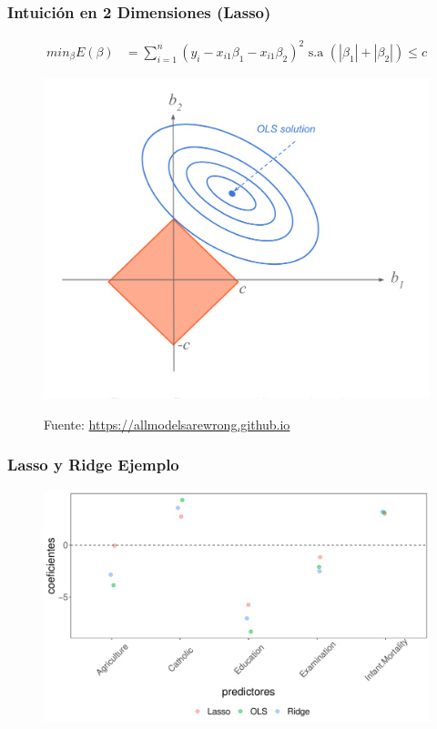 \documentclass[
  shownotes,
  xcolor={svgnames},
  hyperref={colorlinks,citecolor=DarkBlue,linkcolor=DarkRed,urlcolor=DarkBlue}
  , aspectratio=169]{beamer}
\begin{document}
\begin{frame}[fragile]
\frametitle{Intuición en 2 Dimensiones (Lasso)}

\begin{align}
     min_{\beta} E(\beta) &= \sum_{i=1}^n (y_i - x_{i1}\beta_1 - x_{i1}\beta_2)^2  \text{ s.a }   \left( |\beta_1| + |\beta_2| \right) \leq c 
  \end{align}

\begin{figure}[H] \centering
            \captionsetup{justification=centering}
              \includegraphics[scale=0.4]{figures/lasso_ridge2}
 
\tiny
Fuente: \url{https://allmodelsarewrong.github.io}
\end{figure}




\end{frame}
\begin{frame}[fragile]
\frametitle{Lasso y Ridge Ejemplo}

   \begin{figure}[H] \centering
            \captionsetup{justification=centering}
              \includegraphics[scale=0.5]{figures/comp}
 \end{figure}

 \end{frame}
\end{document}
